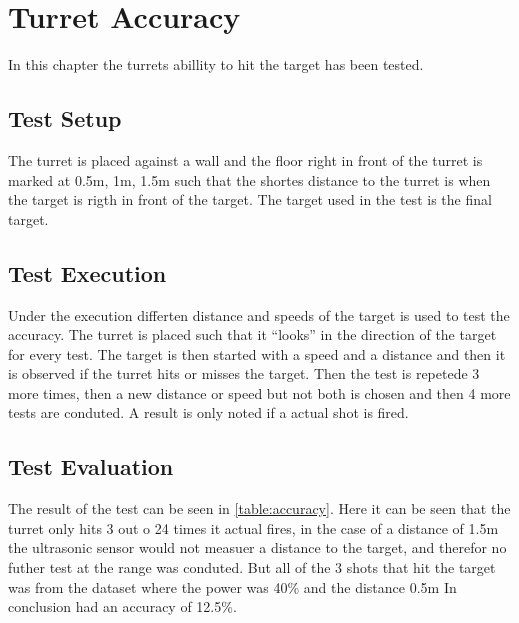 \chapter{Turret Accuracy}\label{TurretAcc}
In this chapter the turrets abillity to hit the target has been tested.

\section{Test Setup}
The turret is placed against a wall and the floor right in front of the turret
is marked at 0.5m, 1m, 1.5m such that the shortes distance to the turret is when
the target is rigth in front of the target. The target used in the test is the final
target.

\section{Test Execution}
Under the execution differten distance and speeds of the target is used to test
the accuracy. The turret is placed such that it ``looks'' in the direction of
the target for every test. The target is then started with a speed and a
distance and then it is observed if the turret hits or misses the target. Then
the test is repetede 3 more times, then a new distance or speed but not both is
chosen and then 4 more tests are conduted. A result is only noted if a actual
shot is fired. 

\section{Test Evaluation}
The result of the test can be seen in \autoref{table:accuracy}. Here it can be
seen that the turret only hits 3 out o 24 times it actual fires, in the case of
a distance of 1.5m the ultrasonic sensor would not measuer a distance to the
target, and therefor no futher test at the range was conduted. But all of the
3 shots that hit the target was from
the dataset where the power was 40\% and the distance 0.5m  In conclusion \names
had an accuracy of 12.5\%.

